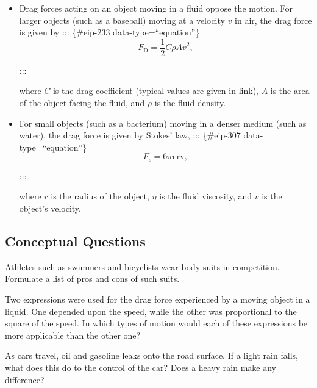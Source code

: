 \documentclass[
]{book}
\begin{document}
\begin{itemize}
\item
  \protect\hypertarget{import-auto-id1165298595649}{}{Drag forces acting on an object moving in a fluid oppose the
  motion. For larger objects (such as a baseball) moving at a velocity
  \(v\) in air, the drag force is given
  by}
  ::: \{\#eip-233 data-type=``equation''\}
  \[{{F_{\text{D}} = \frac{1}{2}}{C\rho Av}^{2}},\]

  :::

  where \(C{}\) is the drag coefficient (typical values are given in
  \protect\hyperlink{import-auto-id1165298535568}{link}), \(A{}\)
  is the area of the object facing the fluid, and \(\rho{}\) is the
  fluid density.
\item
  \protect\hypertarget{import-auto-id1165298748357}{}{For small objects (such as a bacterium) moving in a denser medium
  (such as water), the drag force is given by Stokes'
  law,}
  ::: \{\#eip-307 data-type=``equation''\}
  \[{{{F_{\text{s}} = 6}\text{πηrv}},}{}\]

  :::

  where \(r{}\) is the radius of the object,
  \emph{}\(\eta{}\) is the fluid viscosity, and
  \(v{}\) is the object's velocity.
\end{itemize}

\hypertarget{fs-id1165298645318}{}
\hypertarget{conceptual-questions-19}{%
\subsection{Conceptual Questions}\label{conceptual-questions-19}}

\hypertarget{fs-id1165298899670}{}
\leavevmode{}%
Athletes such as swimmers and bicyclists wear body suits in competition.
Formulate a list of pros and cons of such suits.

\hypertarget{fs-id1165298622189}{}
\leavevmode{}%
Two expressions were used for the drag force experienced by a moving
object in a liquid. One depended upon the speed, while the other was
proportional to the square of the speed. In which types of motion would
each of these expressions be more applicable than the other one?

\hypertarget{fs-id1165296261672}{}
\leavevmode{}%
As cars travel, oil and gasoline leaks onto the road surface. If a light
rain falls, what does this do to the control of the car? Does a heavy
rain make any difference?
\end{document}
